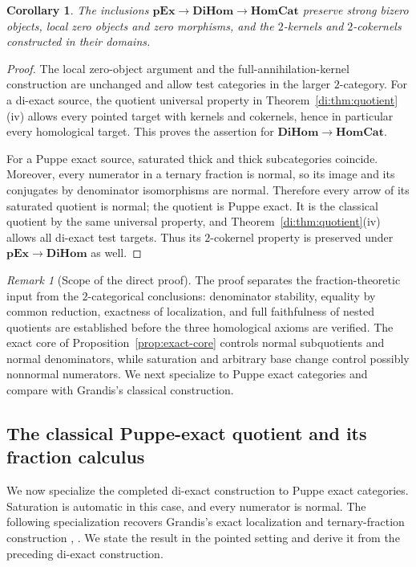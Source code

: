 \documentclass[11pt,reqno,a4paper]{amsart}
\newtheorem{corollary}[theorem]{Corollary}
\theoremstyle{definition}
\theoremstyle{remark}
\newtheorem{remark}[theorem]{Remark}
\newcommand{\0}{\mathbf{0}}
\renewcommand{\1}{\mathbf{1}}
\newcommand{\pExact}{\mathbf{pEx}}
\newcommand{\HomCat}{\mathbf{HomCat}}
\newcommand{\DiHom}{\mathbf{DiHom}}
\begin{document}
\begin{corollary}\label{di:cor:inclusions}
The inclusions $\pExact\to\DiHom\to\HomCat$ preserve strong
bizero objects, local zero objects and zero morphisms, and the
$2$-kernels and $2$-cokernels constructed in their domains.
\end{corollary}
\begin{proof}
The local zero-object argument and the full-annihilation-kernel
construction are unchanged and allow test categories in the larger
$2$-category. For a di-exact source, the quotient universal property
in Theorem~\ref{di:thm:quotient}(iv) allows every pointed target with
kernels and cokernels, hence in particular every homological target.
This proves the assertion for $\DiHom\to\HomCat$.

For a Puppe exact source, saturated thick and thick subcategories
coincide. Moreover, every numerator in a ternary fraction is normal,
so its image and its conjugates by denominator isomorphisms are
normal. Therefore every arrow of its saturated quotient is normal;
the quotient is Puppe exact. It is the classical quotient by the
same universal property, and Theorem~\ref{di:thm:quotient}(iv)
allows all di-exact test targets. Thus its $2$-cokernel property is
preserved under $\pExact\to\DiHom$ as well.
\end{proof}

\begin{remark}[Scope of the direct proof]
The proof separates the fraction-theoretic input from the
$2$-categorical conclusions: denominator stability, equality by
common reduction, exactness of localization, and full faithfulness
of nested quotients are established before the three homological
axioms are verified. The exact core of
Proposition~\ref{prop:exact-core} controls normal subquotients and
normal denominators, while saturation and arbitrary base change
control possibly nonnormal numerators. We next specialize to Puppe exact
categories and compare with Grandis's classical construction.
\end{remark}

\subsection{The classical Puppe-exact quotient and its fraction calculus}

We now specialize the completed di-exact construction to Puppe
exact categories. Saturation is automatic in this case, and every
numerator is normal. The following specialization recovers
Grandis's exact localization and ternary-fraction construction
\cite[Section~5.5]{Grandis13}, \cite{GrandisFractions92}.
We state the result in the pointed setting and derive it from
the preceding di-exact construction.
\end{document}
